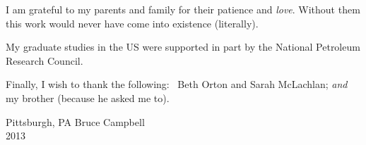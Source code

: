 

\def\baselinestretch{1.0}
 I am grateful to my parents and family for their
patience and {\em love}. Without them this work would never have come into
existence (literally).

My graduate studies in the US were supported in part by the National
Petroleum Research Council.

\medskip
Finally, I wish to thank the following: \,  Beth Orton and Sarah McLachlan;
{\em and } my brother (because he asked me to).

\bigskip\medskip

\noindent Pittsburgh, PA \hfill Bruce Campbell\\
2013


